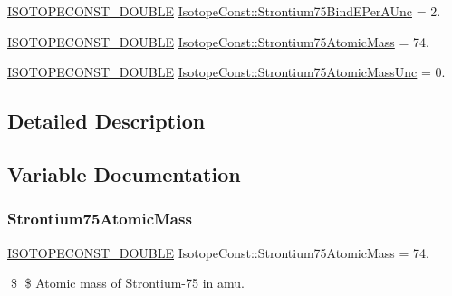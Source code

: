 \begin{DoxyCompactItemize}
\mbox{\hyperlink{group___isotope_const-_macros_ga8f45a7272ce02c0b4c65c44636ed719a}{I\+S\+O\+T\+O\+P\+E\+C\+O\+N\+S\+T\+\_\+\+D\+O\+U\+B\+LE}} \mbox{\hyperlink{group___isotope_const-_strontium-_sr75_gacb9f1e9acdaf1168d2c7a7f844ab51ef}{Isotope\+Const\+::\+Strontium75\+Bind\+E\+Per\+A\+Unc}} = 2.
\item 
\mbox{\hyperlink{group___isotope_const-_macros_ga8f45a7272ce02c0b4c65c44636ed719a}{I\+S\+O\+T\+O\+P\+E\+C\+O\+N\+S\+T\+\_\+\+D\+O\+U\+B\+LE}} \mbox{\hyperlink{group___isotope_const-_strontium-_sr75_ga4a119dc6da3d7a62ce5a9abdbbdcfdf0}{Isotope\+Const\+::\+Strontium75\+Atomic\+Mass}} = 74.
\item 
\mbox{\hyperlink{group___isotope_const-_macros_ga8f45a7272ce02c0b4c65c44636ed719a}{I\+S\+O\+T\+O\+P\+E\+C\+O\+N\+S\+T\+\_\+\+D\+O\+U\+B\+LE}} \mbox{\hyperlink{group___isotope_const-_strontium-_sr75_gaaaa15f83d33959ad287e4787de55136f}{Isotope\+Const\+::\+Strontium75\+Atomic\+Mass\+Unc}} = 0.
\end{DoxyCompactItemize}


\subsection{Detailed Description}


\subsection{Variable Documentation}
\mbox{\label{group___isotope_const-_strontium-_sr75_ga4a119dc6da3d7a62ce5a9abdbbdcfdf0}} 
\subsubsection{\texorpdfstring{Strontium75\+Atomic\+Mass}{Strontium75AtomicMass}}
{\footnotesize\ttfamily \mbox{\hyperlink{group___isotope_const-_macros_ga8f45a7272ce02c0b4c65c44636ed719a}{I\+S\+O\+T\+O\+P\+E\+C\+O\+N\+S\+T\+\_\+\+D\+O\+U\+B\+LE}} Isotope\+Const\+::\+Strontium75\+Atomic\+Mass = 74.}

\$ \$ Atomic mass of Strontium-\/75 in amu. \mbox{\label{group___isotope_const-_strontium-_sr75_gaaaa15f83d33959ad287e4787de55136f}} 
